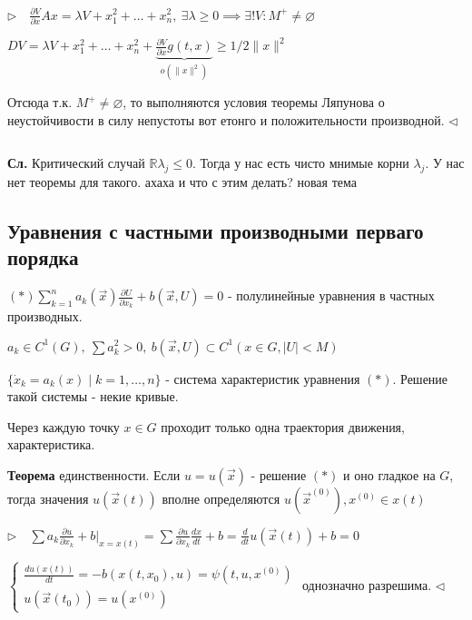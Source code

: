 \documentclass[12pt, a4paper]{article}
\begin{document}
    $\triangleright\quad \frac{\partial V}{\partial x} Ax = \lambda V + x^2_1 + \dotsc + x^2_n, \ \exists \lambda \ge 0 \implies \exists ! V: M^+ \neq \varnothing$

    $DV = \lambda V + x^2_1 + \dotsc + x^2_n + \underbrace{\frac{\partial V}{\partial x}g(t,x)}_{o(\|x\|^2)} \ge 1/2 \|x\|^2$

    Отсюда т.к. $M^+ \neq \varnothing$, то выполняются условия теоремы Ляпунова о неустойчивости в силу непустоты вот етонго и положительности производной. $\triangleleft$
    
    \par $ $ 

    \textbf{Сл.} Критический случай $\mathbb{R}\lambda_j \le 0$. Тогда у нас есть чисто мнимые корни $\lambda_j$. У нас нет теоремы для такого. ахаха и что с этим делать? новая тема

    \subsection*{Уравнения с частными производными перваго порядка}

    $(*) \sum_{k=1}^n a_k (\vec x) \frac{\partial U}{\partial x_k} + b(\vec x, U) = 0$ - полулинейные уравнения в частных производных.

    $a_k \in C^1(G),\ \sum a^2_k > 0,\ b(\vec x, U) \subset C^1(x \in G, |U| < M)$

    $\{\dot x_k = a_k(x) \mid k=1,\dotsc, n \}$ - система характеристик уравнения $(*)$. Решение такой системы - некие кривые.

    Через каждую точку $x \in G$ проходит только одна траектория движения, характеристика. 

    \textbf{Теорема} единственности. Если $u = u(\vec x)$ - решение $(*)$ и оно гладкое на $G$, тогда значения $u(\vec x(t))$ вполне определяются $u(\vec x^{(0)}), x^{(0)} \in x(t)$
    
    $\triangleright\quad \sum a_k \frac{\partial u}{\partial x_k} + b |_{x = x(t)} = \sum \frac{\partial u}{\partial x_k} \frac{d x}{dt} + b = \frac{d}{dt}u(\vec x(t)) + b = 0$

    $\begin{cases}
        \frac{du(x(t))}{dt} = -b(x(t,x_0), u) = \psi(t, u, x^{(0)}) \\ u(\vec x(t_0)) = u(x^{(0)})
    \end{cases}$ однозначно разрешима. $\triangleleft$
    
    \par $ $
\end{document}
